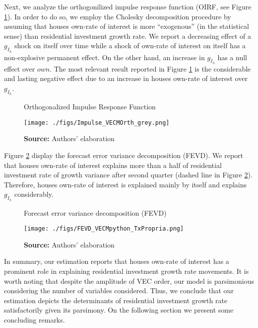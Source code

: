 \documentclass[12pt, a4paper]{article}
\begin{document}
Next, we analyze the orthogonilized impulse response function (OIRF, see Figure \ref{irf}).
In order to do so, we employ the Cholesky decomposition procedure by assuming that houses own-rate of interest is more ``exogenous'' (in the statistical sense) than residential investment growth rate.
We report a decreasing effect of a \(g_{I_h}\) shock on itself over time while a shock of own-rate of interest on itself has a non-explosive permanent effect.
On the other hand, an increase in \(g_{I_h}\) has a null effect over \(own\).
The most relevant result reported in Figure \ref{irf} is the considerable and lasting negative effect due to an increase in houses own-rate of interest over \(g_{I_h}\).

\begin{figure}[H]
	\centering
	\caption{Orthogonalized Impulse Response Function}
	\label{irf}
	\texttt{[image: ./figs/Impulse\_VECMOrth\_grey.png]}
	\caption*{\textbf{Source:} Authors' elaboration}
\end{figure}

Figure \ref{fevd} display the forecast error variance decomposition (FEVD).
We report that houses own-rate of interest explains more than a half of residential investment rate of growth variance after second quarter (dashed line in Figure \ref{fevd}).
Therefore, houses own-rate of interest is explained mainly by itself and explains \(g_{I_h}\) considerably.

\begin{figure}[H]
	\centering
	\caption{Forecast error variance decomposition (FEVD)}
	\label{fevd}
	\texttt{[image: ./figs/FEVD\_VECMpython\_TxPropria.png]}
	\caption*{\textbf{Source:} Authors' elaboration}
\end{figure}


In summary, our estimation reports that houses own-rate of interest has a prominent role in explaining residential investment growth rate movements.
It is worth noting that despite the amplitude of VEC order, our model is parsimonious considering the number of variables considered.
Thus, we conclude that our estimation depicts the determinants of residential investment growth rate satisfactorily given its parsimony.
On the following section we present some concluding remarks.
\end{document}
